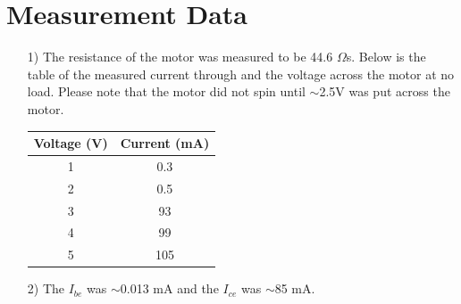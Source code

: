 \documentclass{article}
\begin{document}
\section{Measurement Data}
	\begin{enumerate}
		\item[1)]
			The resistance of the motor was measured to be 44.6 $\Omega$s. Below is the table of the measured current through and the voltage across the motor at no load. Please note that the motor did not spin until $\sim$2.5V was put across the motor.\\
			\begin{tabular}[h]{|c|c|}
				\hline
				Voltage (V) & Current (mA) \\	\hline
				1	&	0.3 \\	\hline
				2 	&	0.5	\\	\hline
				3	&	93	\\	\hline
				4	&	99	\\	\hline
				5	&	105	\\	\hline
			\end{tabular}
			
		\item[2)]
			The $I_{be}$ was $\sim$0.013 mA and the $I_{ce}$ was $\sim$85 mA.
			

\end{enumerate}
\end{document}
